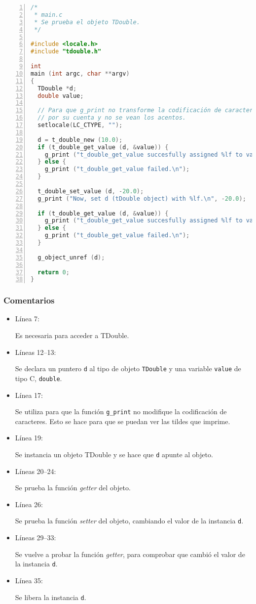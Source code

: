 \begin{lstlisting}[language=C, numbers=left]
/*
 * main.c
 * Se prueba el objeto TDouble.
 */

#include <locale.h>
#include "tdouble.h"

int
main (int argc, char **argv)
{
  TDouble *d;
  double value;

  // Para que g_print no transforme la codificación de caracteres
  // por su cuenta y no se vean los acentos.
  setlocale(LC_CTYPE, "");

  d = t_double_new (10.0);
  if (t_double_get_value (d, &value)) {
    g_print ("t_double_get_value succesfully assigned %lf to value.\n", value);
  } else {
    g_print ("t_double_get_value failed.\n");
  }

  t_double_set_value (d, -20.0);
  g_print ("Now, set d (tDouble object) with %lf.\n", -20.0);
  
  if (t_double_get_value (d, &value)) {
    g_print ("t_double_get_value succesfully assigned %lf to value.\n", value);
  } else {
    g_print ("t_double_get_value failed.\n");
  }
  
  g_object_unref (d);

  return 0;
}
\end{lstlisting}

\subsubsection{Comentarios}
\begin{itemize}
\item Línea 7:\par
  Es necesaria para acceder a \textsf{TDouble}.
\item Líneas 12--13:\par
  Se declara un puntero \texttt{d} al tipo de objeto \texttt{TDouble} y una variable \texttt{value} de tipo C,
  \texttt{double}.
\item Línea 17:\par
  Se utiliza para que la función \texttt{g\_print} no modifique la codificación de caracteres. Esto se hace
  para que se puedan ver las tildes que imprime.
\item Línea 19:\par
  Se instancia un objeto \textsf{TDouble} y se hace que \texttt{d} apunte al objeto.
\item Líneas 20--24:\par
  Se prueba la función \textit{getter} del objeto.
\item Línea 26:\par
  Se prueba la función \textit{setter} del objeto, cambiando el valor de la instancia \texttt{d}.
\item Líneas 29--33:\par
  Se vuelve a probar la función \textit{getter}, para comprobar que cambió el valor de la instancia \texttt{d}.
\item Línea 35:\par
  Se libera la instancia \texttt{d}.
\end{itemize}

